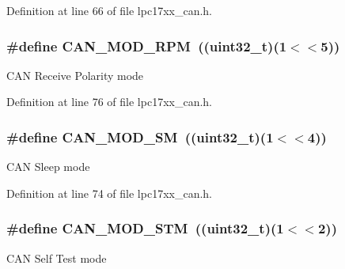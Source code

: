 \-Definition at line 66 of file lpc17xx\-\_\-can.\-h.

\hypertarget{group___c_a_n___private___macros_gaec973a15597675e749f4033835dd66f9}{
\subsubsection[{\-C\-A\-N\-\_\-\-M\-O\-D\-\_\-\-R\-P\-M}]{\setlength{\rightskip}{0pt plus 5cm}\#define {\bf \-C\-A\-N\-\_\-\-M\-O\-D\-\_\-\-R\-P\-M}~((uint32\-\_\-t)(1$<$$<$5))}}\label{group___c_a_n___private___macros_gaec973a15597675e749f4033835dd66f9}
\-C\-A\-N \-Receive \-Polarity mode 

\-Definition at line 76 of file lpc17xx\-\_\-can.\-h.

\hypertarget{group___c_a_n___private___macros_gab0cd0939676d3c6ce846e47cc8cc2b15}{
\subsubsection[{\-C\-A\-N\-\_\-\-M\-O\-D\-\_\-\-S\-M}]{\setlength{\rightskip}{0pt plus 5cm}\#define {\bf \-C\-A\-N\-\_\-\-M\-O\-D\-\_\-\-S\-M}~((uint32\-\_\-t)(1$<$$<$4))}}\label{group___c_a_n___private___macros_gab0cd0939676d3c6ce846e47cc8cc2b15}
\-C\-A\-N \-Sleep mode 

\-Definition at line 74 of file lpc17xx\-\_\-can.\-h.

\hypertarget{group___c_a_n___private___macros_ga0131118db0e68b5635a10777cbd794e7}{
\subsubsection[{\-C\-A\-N\-\_\-\-M\-O\-D\-\_\-\-S\-T\-M}]{\setlength{\rightskip}{0pt plus 5cm}\#define {\bf \-C\-A\-N\-\_\-\-M\-O\-D\-\_\-\-S\-T\-M}~((uint32\-\_\-t)(1$<$$<$2))}}\label{group___c_a_n___private___macros_ga0131118db0e68b5635a10777cbd794e7}
\-C\-A\-N \-Self \-Test mode 

